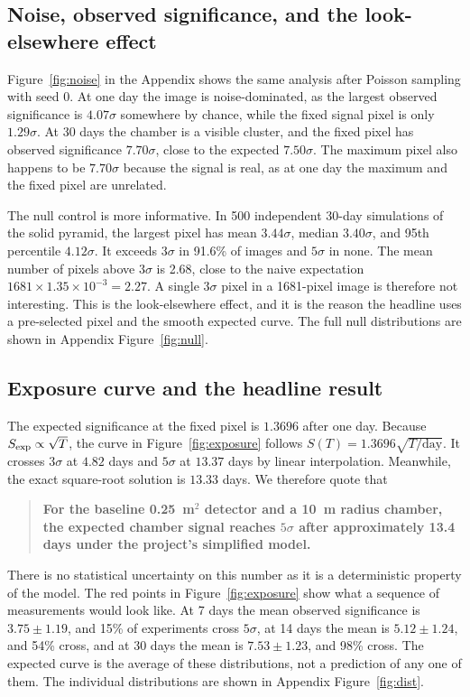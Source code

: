 \documentclass{article}
\begin{document}
\subsection{Noise, observed significance, and the look-elsewhere effect}

Figure~\ref{fig:noise} in the Appendix shows the same analysis after Poisson
sampling with seed 0. At one day the image is noise-dominated, as the largest
observed significance is $4.07\sigma$ somewhere by chance, while the fixed
signal pixel is only $1.29\sigma$. At 30 days the chamber is a visible cluster, and the fixed pixel
has observed significance $7.70\sigma$, close to the expected $7.50\sigma$.
The maximum pixel also happens to be $7.70\sigma$ because the signal is real, as
at one day the maximum and the fixed pixel are unrelated.

The null control is more informative. In 500 independent 30-day simulations of
the solid pyramid, the largest pixel has mean $3.44\sigma$, median
$3.40\sigma$, and 95th percentile $4.12\sigma$. It exceeds $3\sigma$ in 91.6\%
of images and $5\sigma$ in none. The mean number of pixels above $3\sigma$ is
2.68, close to the naive expectation $1681\times1.35\times10^{-3}=2.27$. A
single $3\sigma$ pixel in a 1681-pixel image is therefore not interesting. This
is the look-elsewhere effect, and it is the reason the headline uses a
pre-selected pixel and the smooth expected curve. The full null distributions
are shown in Appendix Figure~\ref{fig:null}.


\subsection{Exposure curve and the headline result}

The expected significance at the fixed pixel is $1.3696$ after one day. Because
$S_{\rm exp}\propto\sqrt{T}$, the curve in Figure~\ref{fig:exposure} follows
$S(T)=1.3696\sqrt{T/\mathrm{day}}$. It crosses $3\sigma$ at $4.82$ days and
$5\sigma$ at $13.37$ days by linear interpolation. Meanwhile, the exact square-root
solution is $13.33$ days. We therefore quote that

\begin{quote}
\textbf{For the baseline 0.25~m$^2$ detector and a 10~m radius chamber, the
expected chamber signal reaches $5\sigma$ after approximately 13.4 days under
the project's simplified model.}
\end{quote}

There is no statistical uncertainty on this number as it is a deterministic
property of the model. The red points in Figure~\ref{fig:exposure} show what a
sequence of measurements would look like. At 7 days the mean observed
significance is $3.75\pm1.19$, and 15\% of experiments cross $5\sigma$, at
14 days the mean is $5.12\pm1.24$, and 54\% cross, and at 30 days the mean is
$7.53\pm1.23$, and 98\% cross. The expected curve is the average of these
distributions, not a prediction of any one of them. The individual distributions
are shown in Appendix Figure~\ref{fig:dist}.
\end{document}
